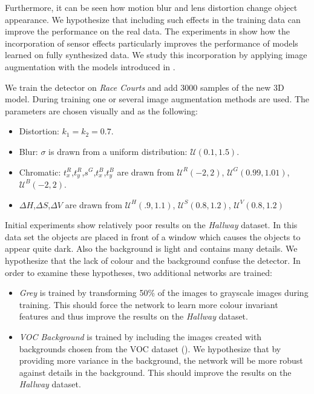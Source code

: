 Furthermore, it can be seen how motion blur and lens distortion change object appearance. We hypothesize that including such effects in the training data can improve the performance on the real data. The experiments in \cite{Carlson2018} show how the incorporation of sensor effects particularly improves the performance of models learned on fully synthesized data. We study this incorporation by applying image augmentation with the models introduced in .

We train the detector on \textit{Race Courts} and add 3000 samples of the new 3D model. During training one or several image augmentation methods are used. The parameters are chosen visually and as the following:

\begin{itemize}
	\item Distortion: $k_1 = k_2 = 0.7$.
	\item Blur: $\sigma$ is drawn from a uniform distribution: $\mathcal{U}(0.1,1.5)$.
	\item Chromatic: $t^R_x$,$t^R_y$,$s^G$,$t^B_x$,$t^B_y$ are drawn from $\mathcal{U}^R(-2,2)$, $\mathcal{U}^G(0.99,1.01)$,$\mathcal{U}^B(-2,2)$.
	\item $\Delta H$,$\Delta S$,$\Delta V$ are drawn from $\mathcal{U}^H(.9, 1.1)$, $\mathcal{U}^S(0.8, 1.2)$, $\mathcal{U}^V(0.8, 1.2)$
\end{itemize}

Initial experiments show relatively poor results on the \textit{Hallway} dataset. In this data set the objects are placed in front of a window which causes the objects to appear quite dark. Also the background is light and contains many details. We hypothesize that the lack of colour and the background confuse the detector. In order to examine these hypotheses, two additional networks are trained:

\begin{itemize}
	\item \textit{Grey} is trained by transforming 50\% of the images to grayscale images during training. This should force the network to learn more colour invariant features and thus improve the results on the \textit{Hallway} dataset. 
	\item \textit{VOC Background} is trained by including the images created with backgrounds chosen from the VOC dataset (). We hypothesize that by providing more variance in the background, the network will be more robust against details in the background. This should improve the results on the \textit{Hallway} dataset.
\end{itemize}

